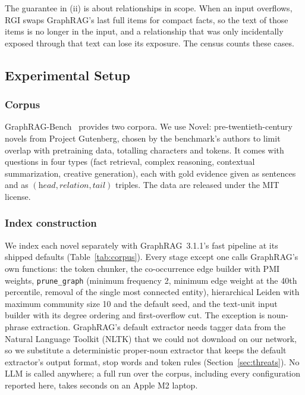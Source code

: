 \documentclass{ieeeaccess}
\theoremstyle{remark}
\begin{document}
The guarantee in (ii) is about relationships in scope. When an input overflows, RGI swaps GraphRAG's last full items for compact facts, so the text of those items is no longer in the input, and a relationship that was only incidentally exposed through that text can lose its exposure. The census counts these cases.

\subsection{Experimental Setup}\label{sec:setup}

\subsubsection{Corpus}
GraphRAG-Bench~\cite{xiang2026graphragbench} provides two corpora. We use Novel: \NNovels{} pre-twentieth-century novels from Project Gutenberg, chosen by the benchmark's authors to limit overlap with pretraining data, totalling \NChars{} characters and \NTokens{} tokens. It comes with \NQuestions{} questions in four types (fact retrieval, complex reasoning, contextual summarization, creative generation), each with gold evidence given as sentences and as $(\textit{head},\textit{relation},\textit{tail})$ triples. The data are released under the MIT license.

\subsubsection{Index construction}
We index each novel separately with GraphRAG~3.1.1's fast pipeline at its shipped defaults (Table~\ref{tab:corpus}). Every stage except one calls GraphRAG's own functions: the token chunker, the co-occurrence edge builder with PMI weights, \texttt{prune\_graph} (minimum frequency 2, minimum edge weight at the 40th percentile, removal of the single most connected entity), hierarchical Leiden with maximum community size 10 and the default seed, and the text-unit input builder with its degree ordering and first-overflow cut. The exception is noun-phrase extraction. GraphRAG's default extractor needs tagger data from the Natural Language Toolkit (NLTK) that we could not download on our network, so we substitute a deterministic proper-noun extractor that keeps the default extractor's output format, stop words and token rules (Section~\ref{sec:threats}). No LLM is called anywhere; a full run over the corpus, including every configuration reported here, takes \RuntimeS{} seconds on an Apple M2 laptop.
\end{document}

